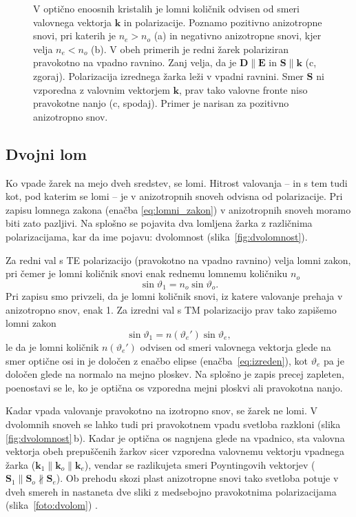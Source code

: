 \begin{figure}[h]
\centering
\def\svgwidth{140truemm} 

\caption{V optično enoosnih kristalih je lomni količnik odvisen
od smeri valovnega vektorja $\mathbf{k}$ in polarizacije. Poznamo pozitivno anizotropne snovi, pri katerih
je $n_e>n_o$ (a) in negativno anizotropne snovi, kjer velja $n_e< n_o$ (b). V obeh primerih je redni 
žarek polariziran pravokotno na vpadno ravnino. Zanj velja, 
da je $\mathbf{D} \parallel \mathbf{E}$ in $\mathbf{S} \parallel \mathbf{k}$ (c, zgoraj). Polarizacija 
izrednega žarka leži v vpadni ravnini. Smer $\mathbf{S}$ ni vzporedna z valovnim vektorjem
$\mathbf{k}$, prav tako valovne fronte niso pravokotne nanjo (c, spodaj). Primer je narisan za pozitivno 
anizotropno snov.}
\label{fig:Elipsa}
\end{figure}
\subsection*{Dvojni lom}
Ko vpade žarek na mejo dveh sredstev, se lomi. Hitrost valovanja -- in s tem tudi 
kot, pod katerim se lomi -- je v anizotropnih snoveh odvisna od polarizacije.
Pri zapisu lomnega zakona (enačba \ref{eq:lomni_zakon}) 
v anizotropnih snoveh moramo biti zato pazljivi. Na splošno
se pojavita dva lomljena žarka z različnima polarizacijama, kar
da ime pojavu: dvolomnost (slika~\ref{fig:dvolomnost}). 

Za redni val s TE polarizacijo (pravokotno na vpadno ravnino) velja lomni zakon, pri čemer
je lomni količnik snovi enak rednemu lomnemu količniku $n_o$
\begin{equation}
\sin\vartheta_{1}=n_{o}\sin\vartheta_{o}.
\end{equation}
Pri zapisu smo privzeli, da je lomni količnik snovi, iz katere valovanje prehaja v anizotropno snov, 
enak 1. Za izredni val s TM polarizacijo 
prav tako zapišemo lomni zakon
\begin{equation}
\sin\vartheta_{1}=n(\vartheta_e')\sin\vartheta_{e},
\end{equation}
le da je lomni količnik $n(\vartheta_e')$ odvisen od smeri valovnega vektorja glede na smer optične osi
in je določen z enačbo elipse (enačba~\ref{eq:izreden}), kot $\vartheta_e$ pa je določen glede na
normalo na mejno ploskev. Na splošno je zapis precej zapleten, poenostavi se le, 
ko je optična os vzporedna mejni ploskvi ali pravokotna nanjo. 

Kadar vpada valovanje pravokotno na izotropno snov, se žarek ne lomi. V 
dvolomnih snoveh se lahko tudi pri pravokotnem vpadu svetloba razkloni (slika
\ref{fig:dvolomnost}\,b). Kadar je optična os nagnjena glede na vpadnico, sta valovna vektorja
obeh prepuščenih žarkov sicer vzporedna valovnemu vektorju vpadnega žarka ($\mathbf{k}_1 \parallel
\mathbf{k}_o \parallel \mathbf{k}_e$), vendar se razlikujeta smeri Poyntingovih vektorjev
($\mathbf{S}_1 \parallel \mathbf{S}_o \nparallel \mathbf{S}_e$). Ob prehodu skozi 
plast anizotropne snovi tako svetloba potuje v dveh smereh in nastaneta dve sliki 
z medsebojno pravokotnima polarizacijama (slika~\ref{foto:dvolom}) . 

